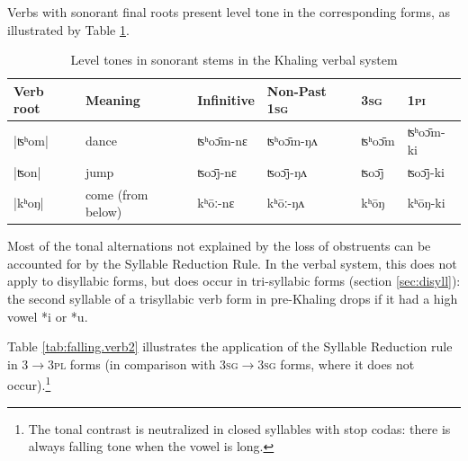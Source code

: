 \documentclass[oldfontcommands,oneside,a4paper,11pt]{article}
\newcommand{\ipa}[1]{{\phon \mbox{#1}}} %
\begin{document}
Verbs with sonorant final roots present level tone in the corresponding forms, as illustrated by Table \ref{tab:level.verb}.


\begin{table}[H]
\caption{Level tones in sonorant stems in the Khaling verbal system} \centering \label{tab:level.verb}
\begin{tabular}{llllll}
\toprule
Verb root	&Meaning	&Infinitive  & Non-Past \textsc{1sg} &  \textsc{3sg} &  \textsc{1pi}\\
\midrule
|ʦʰom|	&	dance		&\ipa{ʦʰoɔ̄m-nɛ}		&\ipa{ʦʰoɔ̄m-ŋʌ}&\ipa{ʦʰoɔ̄m} &\ipa{ʦʰoɔ̄m-ki} \\
|ʦon|	&	jump		&\ipa{ʦoɔ̄j-nɛ}		&\ipa{ʦoɔ̄j-ŋʌ}&\ipa{ʦoɔ̄j} &\ipa{ʦoɔ̄j-ki} \\
|kʰoŋ|	&	come (from below)		&\ipa{kʰōː-nɛ}		&\ipa{kʰōː-ŋʌ}&\ipa{kʰōŋ} &\ipa{kʰōŋ-ki} \\
\bottomrule
\end{tabular}
\end{table}



Most of the tonal alternations not explained by the loss of obstruents can be accounted for by the  Syllable Reduction Rule. In the verbal system, this does not apply to disyllabic forms, but does  occur in tri-syllabic forms (section \ref{sec:disyll}): the second syllable of a trisyllabic verb form in pre-Khaling drops if it had a high vowel \ipa{*i} or \ipa{*u}.

Table  \ref{tab:falling.verb2} illustrates the application of the Syllable Reduction rule in \textsc{3$\rightarrow$3pl} forms (in comparison with \textsc{3sg$\rightarrow$3sg} forms, where it does not occur).\footnote{The tonal contrast is neutralized  in closed syllables with stop codas: there is always falling tone when the vowel is long. }
 
\end{document}
